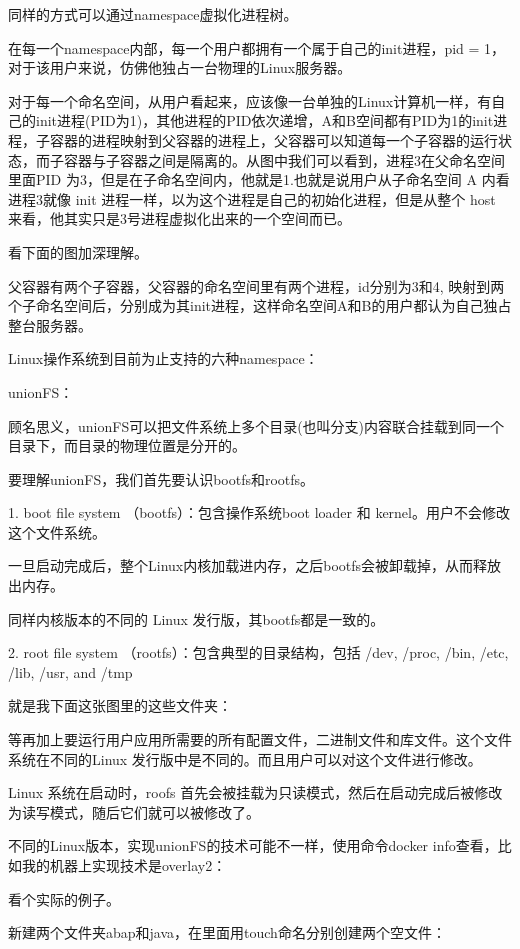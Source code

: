 同样的方式可以通过namespace虚拟化进程树。

在每一个namespace内部，每一个用户都拥有一个属于自己的init进程，pid = 1，对于该用户来说，仿佛他独占一台物理的Linux服务器。

对于每一个命名空间，从用户看起来，应该像一台单独的Linux计算机一样，有自己的init进程(PID为1)，其他进程的PID依次递增，A和B空间都有PID为1的init进程，子容器的进程映射到父容器的进程上，父容器可以知道每一个子容器的运行状态，而子容器与子容器之间是隔离的。从图中我们可以看到，进程3在父命名空间里面PID 为3，但是在子命名空间内，他就是1.也就是说用户从子命名空间 A 内看进程3就像 init 进程一样，以为这个进程是自己的初始化进程，但是从整个 host 来看，他其实只是3号进程虚拟化出来的一个空间而已。

看下面的图加深理解。

父容器有两个子容器，父容器的命名空间里有两个进程，id分别为3和4, 映射到两个子命名空间后，分别成为其init进程，这样命名空间A和B的用户都认为自己独占整台服务器。

Linux操作系统到目前为止支持的六种namespace：

unionFS：

顾名思义，unionFS可以把文件系统上多个目录(也叫分支)内容联合挂载到同一个目录下，而目录的物理位置是分开的。

要理解unionFS，我们首先要认识bootfs和rootfs。

1. boot file system （bootfs）：包含操作系统boot loader 和 kernel。用户不会修改这个文件系统。

一旦启动完成后，整个Linux内核加载进内存，之后bootfs会被卸载掉，从而释放出内存。

同样内核版本的不同的 Linux 发行版，其bootfs都是一致的。

2. root file system （rootfs）：包含典型的目录结构，包括 /dev, /proc, /bin, /etc, /lib, /usr, and /tmp

就是我下面这张图里的这些文件夹：

等再加上要运行用户应用所需要的所有配置文件，二进制文件和库文件。这个文件系统在不同的Linux 发行版中是不同的。而且用户可以对这个文件进行修改。

Linux 系统在启动时，roofs 首先会被挂载为只读模式，然后在启动完成后被修改为读写模式，随后它们就可以被修改了。

不同的Linux版本，实现unionFS的技术可能不一样，使用命令docker info查看，比如我的机器上实现技术是overlay2：

看个实际的例子。

新建两个文件夹abap和java，在里面用touch命名分别创建两个空文件：

